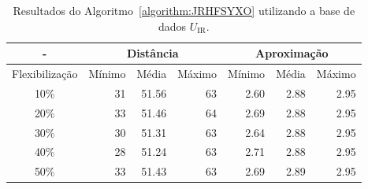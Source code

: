 \begin{table}[!htb]
  \caption{Resultados do Algoritmo~\ref{algorithm:JRHFSYXO} utilizando a base de dados $U_{\text{IR}}$.}
  \label{table:JCSOIDPK}
  \centering
  \begin{tabular}{|c|r|r|r|r|r|r|}
    \hline
      -            & \multicolumn{3}{c|}{Distância}             & \multicolumn{3}{c|}{Aproximação}           \\ \hline
    Flexibilização & Mínimo       & Média        & Máximo       & Mínimo       & Média        & Máximo       \\ \hline  
    10\%           & 31           & 51.56        & 63           & 2.60         & 2.88         & 2.95         \\ \hline
    20\%           & 33           & 51.46        & 64           & 2.69         & 2.88         & 2.95         \\ \hline
    30\%           & 30           & 51.31        & 63           & 2.64         & 2.88         & 2.95         \\ \hline
    40\%           & 28           & 51.24        & 63           & 2.71         & 2.88         & 2.95         \\ \hline
    50\%           & 33           & 51.43        & 63           & 2.69         & 2.89         & 2.95         \\ \hline    
  \end{tabular}
\end{table}